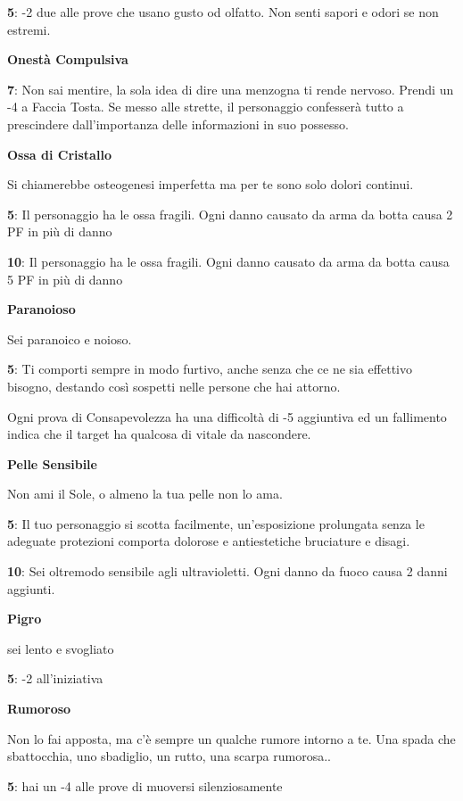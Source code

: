 \documentclass[a4paper,11pt,twoside,openany]{book}
\begin{document}
{\textbf{5}: -2 due alle prove che usano gusto od olfatto. Non senti sapori e odori se non estremi.

\textbf{Onestà Compulsiva}

\textbf{7}: Non sai mentire, la sola idea di dire una menzogna ti rende nervoso. Prendi un -4 a Faccia Tosta. Se messo alle strette, il personaggio confesserà tutto a prescindere dall'importanza delle informazioni in suo possesso.

\textbf{Ossa di Cristallo}

Si chiamerebbe osteogenesi imperfetta ma per te sono solo dolori continui.

\textbf{5}: Il personaggio ha le ossa fragili. Ogni danno causato da arma da botta causa 2 PF in più di danno

\textbf{10}: Il personaggio ha le ossa fragili. Ogni danno causato da arma da botta causa 5 PF in più di danno

\textbf{Paranoioso}

Sei paranoico e noioso.

\textbf{5}: Ti comporti sempre in modo furtivo, anche senza che ce ne sia effettivo bisogno, destando così sospetti nelle persone che hai attorno.

Ogni prova di Consapevolezza ha una difficoltà di -5 aggiuntiva ed un fallimento indica che il target ha qualcosa di vitale da nascondere.

\textbf{Pelle Sensibile}

Non ami il Sole, o almeno la tua pelle non lo ama.

\textbf{5}: Il tuo personaggio si scotta facilmente, un'esposizione prolungata senza le adeguate protezioni comporta dolorose e antiestetiche bruciature e disagi.

\textbf{10}: Sei oltremodo sensibile agli ultravioletti. Ogni danno da fuoco causa 2 danni aggiunti.

\textbf{Pigro}

sei lento e svogliato

\textbf{5}: -2 all'iniziativa

\textbf{Rumoroso}

Non lo fai apposta, ma c'è sempre un qualche rumore intorno a te. Una spada che sbattocchia, uno sbadiglio, un rutto, una scarpa rumorosa..

\textbf{5}: hai un -4 alle prove di muoversi silenziosamente

}
\end{document}
